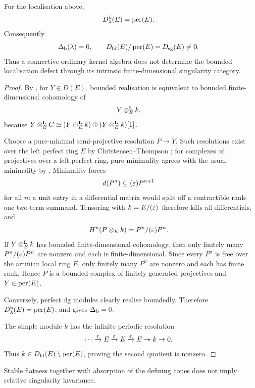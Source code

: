 \begin{theorem}\label{thm:dual-numbers}
For the localisation above,
\[
 D^{\mathrm b}_\lambda(E)=\operatorname{per}(E).
\]
Consequently
\[
 \Delta_{\mathrm b}(\lambda)=0,
 \qquad
 D_{\mathrm{fd}}(E)/\operatorname{per}(E)=D_{\mathrm{sg}}(E)\ne0.
\]
Thus a connective ordinary kernel algebra does not determine the bounded localisation defect through its intrinsic finite-dimensional singularity category.
\end{theorem}

\begin{proof}
By , for \(Y\in D(E)\), bounded realisation is equivalent to bounded finite-dimensional cohomology of
\[
 Y\otimes^{\mathbf L}_Ek,
\]
because
\(Y\otimes^{\mathbf L}_EC\simeq(Y\otimes^{\mathbf L}_Ek)\oplus(Y\otimes^{\mathbf L}_Ek)[1]\).

Choose a pure-minimal semi-projective resolution \(P\to Y\).  Such resolutions exist over the left perfect ring \(E\) by Christensen--Thompson \cite[Theorem~5.7]{ChristensenThompson}; for complexes of projectives over a left perfect ring, pure-minimality agrees with the usual minimality by \cite[Theorem~3.13 and Corollary~3.14]{ChristensenThompson}.  Minimality forces
\[
 d(P^n)\subseteq(\varepsilon)P^{n+1}
\]
for all \(n\): a unit entry in a differential matrix would split off a contractible rank-one two-term summand.  Tensoring with
\(k=E/(\varepsilon)\) therefore kills all differentials, and
\[
 H^n(P\otimes_Ek)=P^n/(\varepsilon)P^n.
\]
If \(Y\otimes^{\mathbf L}_Ek\) has bounded finite-dimensional cohomology, then only finitely many \(P^n/(\varepsilon)P^n\) are nonzero and each is finite-dimensional.  Since every \(P^n\) is free over the artinian local ring \(E\), only finitely many \(P^n\) are nonzero and each has finite rank.  Hence \(P\) is a bounded complex of finitely generated projectives and \(Y\in\operatorname{per}(E)\).

Conversely, perfect dg modules clearly realise boundedly.  Therefore
\(D^{\mathrm b}_\lambda(E)=\operatorname{per}(E)\), and  gives \(\Delta_{\mathrm b}=0\).

The simple module \(k\) has the infinite periodic resolution
\[
 \cdots\xrightarrow{\varepsilon}E\xrightarrow{\varepsilon}E
 \xrightarrow{\varepsilon}E\twoheadrightarrow k\to0.
\]
Thus \(k\in D_{\mathrm{fd}}(E)\setminus\operatorname{per}(E)\), proving the second quotient is nonzero.
\end{proof}

\begin{corollary}\label{cor:false-cone-absorption}
Stable flatness together with absorption of the defining cones does not imply relative singularity invariance.
\end{corollary}

